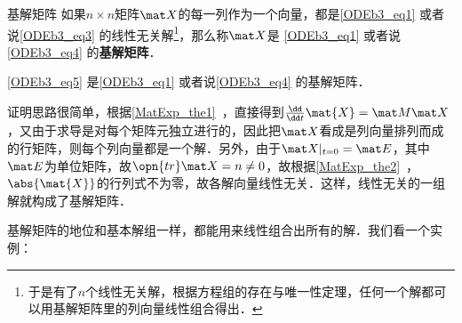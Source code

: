 \begin{definition}{基解矩阵}
如果$n\times n$矩阵$\mat X$的每一列作为一个向量，都是\autoref{ODEb3_eq1} 或者说\autoref{ODEb3_eq3} 的线性无关解\footnote{于是有了$n$个线性无关解，根据方程组的存在与唯一性定理，任何一个解都可以用基解矩阵里的列向量线性组合得出．}，那么称$\mat X$是 \autoref{ODEb3_eq1} 或者说\autoref{ODEb3_eq4} 的\textbf{基解矩阵}．
\end{definition}

\begin{theorem}{}
\autoref{ODEb3_eq5} 是\autoref{ODEb3_eq1} 或者说\autoref{ODEb3_eq4} 的基解矩阵．
\end{theorem}

证明思路很简单，根据\autoref{MatExp_the1}~，直接得到$\frac{\dd}{\dd t}\mat{X}=\mat M\mat X$，又由于求导是对每个矩阵元独立进行的，因此把$\mat X$看成是列向量排列而成的行矩阵，则每个列向量都是一个解．另外，由于$\mat X|_{t=0}=\mat E$，其中$\mat E$为单位矩阵，故$\opn{tr}\mat X=n\not=0$，故根据\autoref{MatExp_the2}~，$\abs{\mat{X}}$的行列式不为零，故各解向量线性无关．这样，线性无关的一组解就构成了基解矩阵．


基解矩阵的地位和基本解组一样，都能用来线性组合出所有的解．我们看一个实例：


